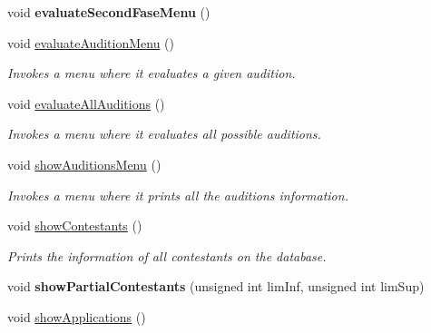 \begin{DoxyCompactItemize}
void {\bfseries evaluate\+Second\+Fase\+Menu} ()
\item 
\mbox{\label{class_company_m_s_a0b6d624aa19b526f0fea30152929d83c}} 
void \hyperlink{class_company_m_s_a0b6d624aa19b526f0fea30152929d83c}{evaluate\+Audition\+Menu} ()
\begin{DoxyCompactList}\small\item\em Invokes a menu where it evaluates a given audition. \end{DoxyCompactList}\item 
\mbox{\label{class_company_m_s_a1056653451fcaaabc316b93e619a5d3b}} 
void \hyperlink{class_company_m_s_a1056653451fcaaabc316b93e619a5d3b}{evaluate\+All\+Auditions} ()
\begin{DoxyCompactList}\small\item\em Invokes a menu where it evaluates all possible auditions. \end{DoxyCompactList}\item 
\mbox{\label{class_company_m_s_ae07132a023117ea4e28e6ba1c8339731}} 
void \hyperlink{class_company_m_s_ae07132a023117ea4e28e6ba1c8339731}{show\+Auditions\+Menu} ()
\begin{DoxyCompactList}\small\item\em Invokes a menu where it prints all the auditions information. \end{DoxyCompactList}\item 
\mbox{\label{class_company_m_s_ac937fa14bf70bed40beced7502a5db21}} 
void \hyperlink{class_company_m_s_ac937fa14bf70bed40beced7502a5db21}{show\+Contestants} ()
\begin{DoxyCompactList}\small\item\em Prints the information of all contestants on the database. \end{DoxyCompactList}\item 
\mbox{\label{class_company_m_s_abcf7feaa5979b0b7b2e6214f435e13d5}} 
void {\bfseries show\+Partial\+Contestants} (unsigned int lim\+Inf, unsigned int lim\+Sup)
\item 
\mbox{\label{class_company_m_s_aca0d13073246666630172336f70b9f77}} 
void \hyperlink{class_company_m_s_aca0d13073246666630172336f70b9f77}{show\+Applications} ()

\end{DoxyCompactItemize}
